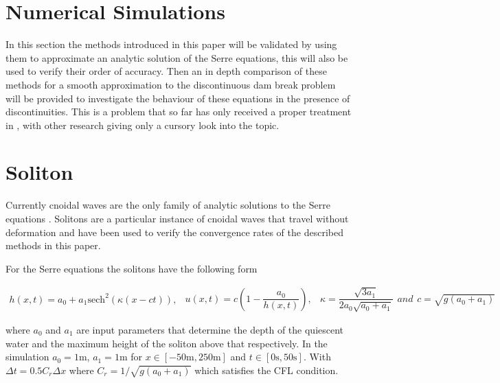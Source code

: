 \documentclass[SingleSpace,12pt,Proceedings]{Serre_ASCE}
\begin{document}
\section{Numerical Simulations}
\label{section:Numerical Simulations}
In this section the methods introduced in this paper will be validated by using them to approximate an analytic solution of the Serre equations, this will also be used to verify their order of accuracy. Then an in depth comparison of these methods for a smooth approximation to the discontinuous dam break problem will be provided to investigate the behaviour of these equations in the presence of discontinuities. This is a problem that so far has only received a proper treatment in \cite{El-etal-2006}, with other research giving only a cursory look into the topic. 

\section{Soliton}
\label{section:Convergence Rate}
Currently cnoidal waves are the only family of analytic solutions to the Serre equations \cite{Carter-Cienfuegos-2010-259}. Solitons are a particular instance of cnoidal waves that travel without deformation and have been used to verify the convergence rates of the described methods in this paper. 

For the Serre equations the solitons have the following form
\begin{linenomath*}
\begin{subequations}
\begin{gather}
h\left(x,t\right) = a_0 + a_1\text{sech}^2\left( \kappa\left(x - ct\right)\right),
\end{gather}
\begin{gather}
u\left(x,t\right) = c\left(1 - \dfrac{a_0}{h(x,t)} \right),
\end{gather}
\begin{gather}
\kappa = \dfrac{\sqrt{3a_1}}{2a_0 \sqrt{ a_0 + a_1}}
\end{gather}
and
\begin{gather}
c = \sqrt{g \left(a_0 + a_1\right)}
\end{gather}
\end{subequations}
\label{eq:sol}
\end{linenomath*}
where $a_0$ and $a_1$ are input parameters that determine the depth of the quiescent water and the maximum height of the soliton above that respectively. In the simulation $a_0 = 1\text{m}$, $a_1 = 1\text{m}$ for $x\in\left[-50\text{m},250\text{m}\right]$ and $t\in\left[0\text{s},50\text{s}\right]$. With $\Delta t = 0.5 C_r \Delta x$ where $C_r = 1 / \sqrt{g \left(a_0 + a_1\right)}$ which satisfies the CFL condition. 
\end{document}
